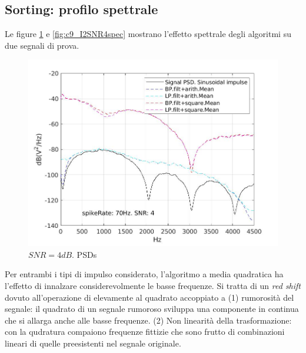 \documentclass[9pt,twocolumn,twoside]{osajnl}
\begin{document}
\subsection{Sorting: profilo spettrale}

Le figure \ref{fig:c9_I5SNR4spec} e \ref{fig:c9_I2SNR4spec} mostrano l'effetto spettrale degli algoritmi su due segnali di prova.



\begin{figure}[htbp]
\centering
\includegraphics[width=1\linewidth]{results/c9_I5SNR4spec.jpg}
\caption{$SNR = 4dB$. PSDs}
\label{fig:c9_I5SNR4spec}
\end{figure}

Per entrambi i tipi di impulso considerato, l'algoritmo a media quadratica ha l'effetto di innalzare considerevolmente le basse frequenze. Si tratta di un {\it red shift} dovuto all'operazione di elevamente al quadrato accoppiato a (1) rumorosità del segnale: il quadrato di un segnale rumoroso sviluppa una componente in continua che si allarga anche alle basse frequenze. (2) Non linearità della trasformazione: con la qudratura compaiono frequenze fittizie che sono frutto di combinazioni lineari di quelle preesistenti nel segnale originale.
\end{document}
